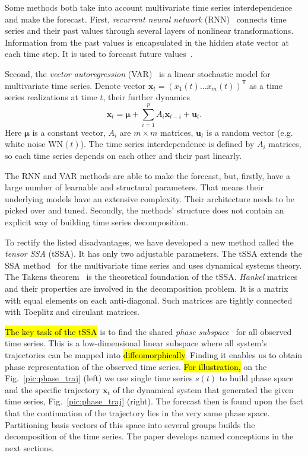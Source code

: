 \documentclass[referee, pdflatex, sn-mathphys-num]{sn-jnl}
\theoremstyle{definition}
\theoremstyle{plain}
\begin{document}
	Some methods both take into account multivariate time series interdependence and make the forecast. First, \emph{recurrent neural network} (RNN)~\cite{neco} connects time series and their past values through several layers of nonlinear transformations. Information from the past values is encapsulated in the hidden state vector at each time step. It is used to forecast future values~\cite{TEALAB2018334}.
	
	Second, the	\emph{vector autoregression} (VAR)~\cite{VAR_model1, doi:10.1080/01621459.1962.10480664} is a linear stochastic model for multivariate time series. Denote vector $ \mathbf{x}_t = (x_1(t) \ldots x_m(t))^{\mathsf{T}} $ as a time series realizations at time $ t $, their further dynamics	\begin{equation*}
		\mathbf{x}_t = \boldsymbol{\mu} + \sum\limits_{i = 1}^p A_i \mathbf{x}_{t - i} + \mathbf{u}_t.
	\end{equation*} Here  $ \boldsymbol{\mu} $ is a constant vector, $ A_i $ are $ m \times m $ matrices, $ \mathbf{u}_t $ is a random vector (e.g. white noise $ \text{WN}(t) $). The time series interdependence is defined by $ A_i $ matrices, so each time series depends on each other and their past linearly.
	
	The RNN and VAR methods are able to make the forecast, but, firstly, have a large number of learnable and structural parameters. That means their underlying models have an extensive complexity. Their architecture needs to be picked over and tuned. Secondly, the methods' structure does not contain an explicit way of building time series decomposition.
	
	To rectify the listed disadvantages, we have developed a new method called the \emph{tensor SSA} (tSSA). It has only two adjustable parameters. The tSSA extends the SSA method~\cite{ecfb9dc578be43ae9ee8fc88b8ff9151} for the multivariate time series and uses dynamical systems theory. The Takens theorem~\cite{citeulike:2735031} is the theoretical foundation of the tSSA. \emph{Hankel} matrices and their properties are involved in the decomposition problem. It is a matrix with equal elements on each anti-diagonal. Such matrices are tightly connected with Toeplitz and circulant matrices.
	
	\hl{The key task of the tSSA} is to find the shared \emph{phase subspace}~\cite{1572261550523548160, ignatov2016human} for all observed time series. This is a low-dimensional linear subspace where all system's trajectories can be mapped into \hl{diffeomorphically}. Finding it enables us to obtain phase representation of the observed time series. \hl{For illustration,} on the Fig.~\ref{pic:phase_traj} (left) we use single time series $ s(t) $ to build phase space and the specific trajectory $ \mathbf{x}_t $ of the dynamical system that generated the given time series, Fig.~\ref{pic:phase_traj} (right). The forecast then is found upon the fact that the continuation of the trajectory lies in the very same phase space. Partitioning basis vectors of this space into several groups builds the decomposition of the time series. The paper develops named conceptions in the next sections.
	
\end{document}

